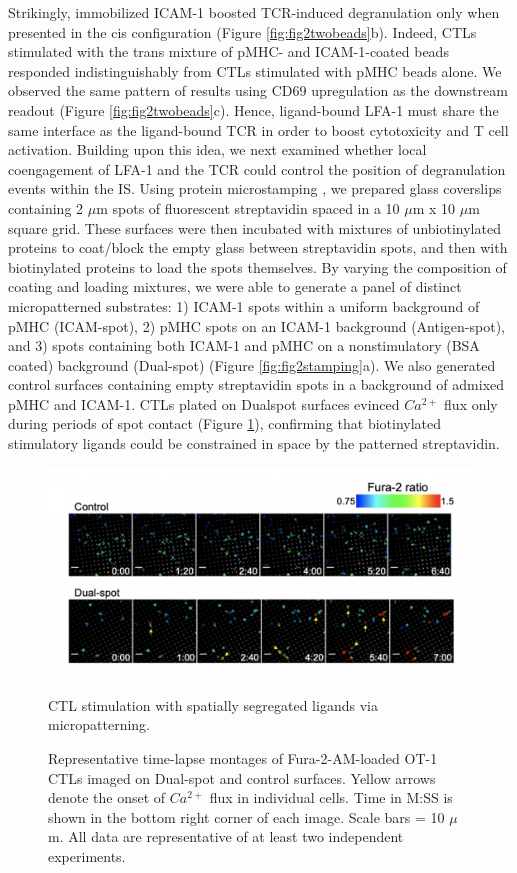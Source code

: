 Strikingly, immobilized ICAM-1 boosted TCR-induced degranulation only when presented in the cis configuration (Figure \ref{fig:fig2twobeads}b). Indeed, CTLs stimulated with the trans mixture of pMHC- and ICAM-1-coated beads responded indistinguishably from CTLs stimulated with pMHC beads alone. We observed the same pattern of results using CD69 upregulation as the downstream readout (Figure \ref{fig:fig2twobeads}c). Hence, ligand-bound LFA-1 must share the same interface as the ligand-bound TCR in order to boost cytotoxicity and T cell activation. Building upon this idea, we next examined whether local coengagement of LFA-1 and the TCR could control the position of degranulation events within the IS. Using protein microstamping \cite{Bashour2014}, we prepared glass coverslips containing 2 $\mu$m spots of fluorescent streptavidin spaced in a 10 $\mu$m x 10 $\mu$m square grid. These surfaces were then incubated with mixtures of unbiotinylated proteins to coat/block the empty glass between streptavidin spots, and then with biotinylated proteins to load the spots themselves. By varying the composition of coating and loading mixtures, we were able to generate a panel of distinct micropatterned substrates: 1) ICAM-1 spots within a uniform background of pMHC (ICAM-spot), 2) pMHC spots on an ICAM-1 background (Antigen-spot), and 3) spots containing both ICAM-1 and pMHC on a nonstimulatory (BSA coated) background (Dual-spot) (Figure \ref{fig:fig2stamping}a). We also generated control surfaces containing empty streptavidin spots in a background of admixed pMHC and ICAM-1. CTLs plated on Dualspot surfaces evinced $Ca^{2+}$ flux only during periods of spot contact (Figure \ref{fig:fig2stampingcaflux}), confirming that biotinylated stimulatory ligands could be constrained in space by the patterned streptavidin. 

\begin{figure}[htbp]
	\centering
	\includegraphics[width=1.0\columnwidth]{../figures/chapter3/fig2stampingcaflux.png}
	\caption{CTL stimulation with spatially segregated ligands via micropatterning.}
	\caption*{Representative time-lapse montages of Fura-2-AM-loaded
OT-1 CTLs imaged on Dual-spot and control surfaces. Yellow arrows denote the onset of $Ca^{2+}$ flux in individual cells. Time in M:SS is shown in the bottom right corner of each image. Scale bars = 10 $\mu$m. All data are representative of at least two independent experiments.}
	\label{fig:fig2stampingcaflux}
\end{figure} 

